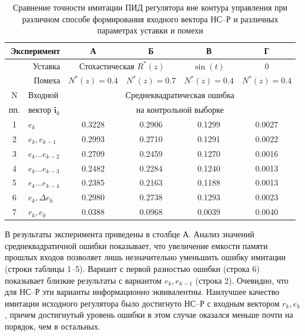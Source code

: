 \begin{table}[ht]
\centering
\caption{Сравнение точности имитации ПИД регулятора вне контура управления
         при различном способе формирования входного вектора НС--Р и
         различных параметрах уставки и помехи}
\label{tabl:nnc_pretr_input_vec}
\begin{tabular}{|c|l|c|c|c|c|}
\hline
\multicolumn{2}{|r|}{Эксперимент} & {\sf А} & {\sf Б} & {\sf В} & {\sf Г}\\
\hline
\multicolumn{2}{|r|}{Уставка} &
  \multicolumn{2}{|c|}{Стохастическая $R^*(z)$} & $\sin(t)$ & $0$ \\
\hline
\multicolumn{2}{|r|}{Помеха} & $N^*(z)=0.4$ & $N^*(z)=0.7$ & $N^*(z)=0.4$ & $N^*(z)=0.4$\\
\hline\hline
N   & Входной               & \multicolumn{4}{|c|}{Среднеквадратическая ошибка} \\
пп. & вектор $\mathbf{i}_k$ & \multicolumn{4}{|c|}{на контрольной выборке}\\
\hline
1 & $e_k$                 & 0.3228 & 0.2906 & 0.1299 & 0.0027\\
2 & $e_k,e_{k-1}$         & 0.2993 & 0.2710 & 0.1291 & 0.0022\\
3 & $e_k\ldots e_{k-2}$   & 0.2709 & 0.2459 & 0.1270 & 0.0016\\
4 & $e_k\ldots e_{k-3}$   & 0.2482 & 0.2284 & 0.1240 & 0.0013\\
5 & $e_k\ldots e_{k-4}$   & 0.2385 & 0.2163 & 0.1188 & 0.0013\\
6 & $e_k,\Delta e_k$      & 0.2980 & 0.2738 & 0.1293 & 0.0023\\
7 & $r_k,e_k$             & 0.0388 & 0.0968 & 0.0039 & 0.0040\\
\hline
\end{tabular}
\end{table}


В  результаты эксперимента приведены
в столбце {\sf А}.  Анализ значений среднеквадратичной ошибки
показывает, что увеличение емкости памяти прошлых входов позволяет
лишь незначительно уменьшить ошибку имитации (строки таблицы 1--5).
Вариант с первой разностью ошибки (строка 6) показывает близкие
результаты с вариантом $e_k,e_{k-1}$ (строка 2).  Очевидно, что для
НС--Р эти варианты информационно эквивалентны.  Наилучшее качество
имитации исходного регулятора было достигнуто НС--Р с входным вектором
$r_k,e_k$, причем достигнутый уровень ошибки в этом случае оказался
меньше почти на порядок, чем в остальных.

